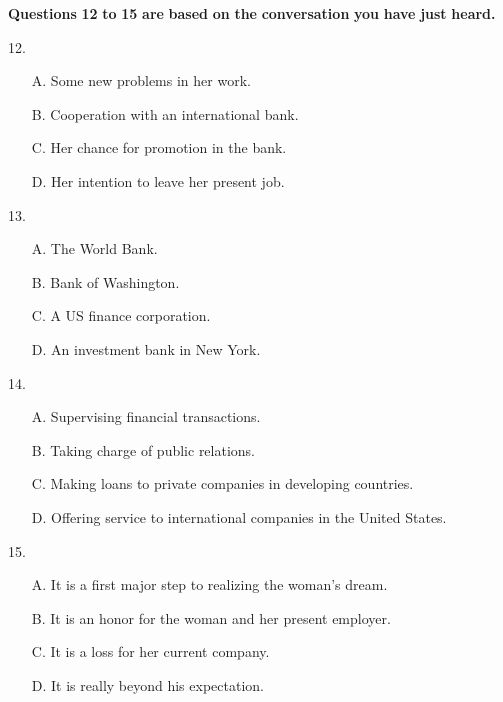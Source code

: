 \documentclass[UTF8,11pt]{ctexart}
\begin{document}
\textbf{Questions} \textbf{12} \textbf{to} \textbf{15} \textbf{are} \textbf{based} \textbf{on} \textbf{the} \textbf{conversation} \textbf{you} \textbf{have} \textbf{just} \textbf{heard.}


12.


\begin{itemize}[leftmargin=2em,itemsep=.2em,topsep=.4em]\item[A.] Some new problems in her work.
\item[B.] Cooperation with an international bank.
\item[C.] Her chance for promotion in the bank.
\item[D.] Her intention to leave her present job.
\end{itemize}

13.


\begin{itemize}[leftmargin=2em,itemsep=.2em,topsep=.4em]\item[A.] The World Bank.
\item[B.] Bank of Washington.
\item[C.] A US finance corporation.
\item[D.] An investment bank in New York.
\end{itemize}

14.


\begin{itemize}[leftmargin=2em,itemsep=.2em,topsep=.4em]\item[A.] Supervising financial transactions.
\item[B.] Taking charge of public relations.
\item[C.] Making loans to private companies in developing countries.
\item[D.] Offering service to international companies in the United States.
\end{itemize}

15.


\begin{itemize}[leftmargin=2em,itemsep=.2em,topsep=.4em]\item[A.] It is a first major step to realizing the woman’s dream.
\item[B.] It is an honor for the woman and her present employer.
\item[C.] It is a loss for her current company.
\item[D.] It is really beyond his expectation.
\end{itemize}
\end{document}
